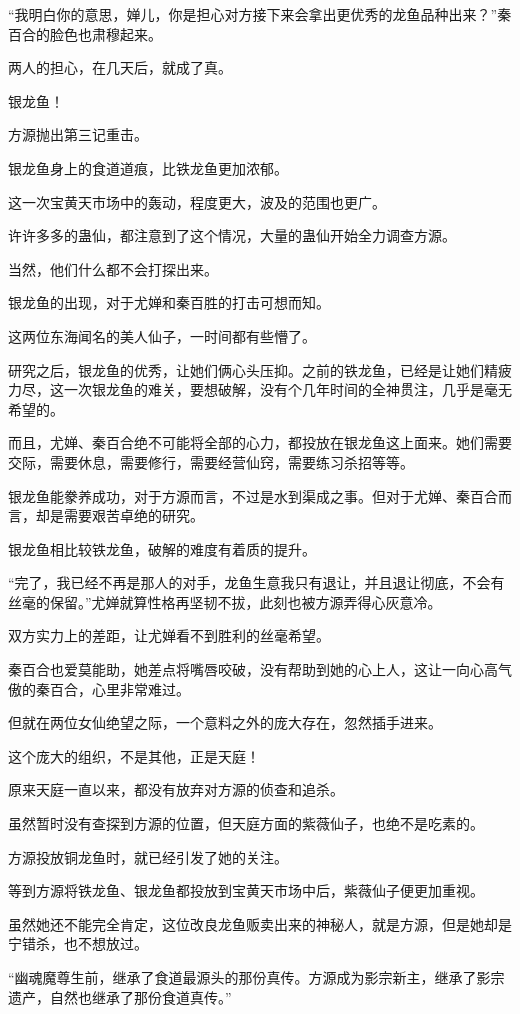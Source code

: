 \begin{this_body}
“我明白你的意思，婵儿，你是担心对方接下来会拿出更优秀的龙鱼品种出来？”秦百合的脸色也肃穆起来。

两人的担心，在几天后，就成了真。

银龙鱼！

方源抛出第三记重击。

银龙鱼身上的食道道痕，比铁龙鱼更加浓郁。

这一次宝黄天市场中的轰动，程度更大，波及的范围也更广。

许许多多的蛊仙，都注意到了这个情况，大量的蛊仙开始全力调查方源。

当然，他们什么都不会打探出来。

银龙鱼的出现，对于尤婵和秦百胜的打击可想而知。

这两位东海闻名的美人仙子，一时间都有些懵了。

研究之后，银龙鱼的优秀，让她们俩心头压抑。之前的铁龙鱼，已经是让她们精疲力尽，这一次银龙鱼的难关，要想破解，没有个几年时间的全神贯注，几乎是毫无希望的。

而且，尤婵、秦百合绝不可能将全部的心力，都投放在银龙鱼这上面来。她们需要交际，需要休息，需要修行，需要经营仙窍，需要练习杀招等等。

银龙鱼能豢养成功，对于方源而言，不过是水到渠成之事。但对于尤婵、秦百合而言，却是需要艰苦卓绝的研究。

银龙鱼相比较铁龙鱼，破解的难度有着质的提升。

“完了，我已经不再是那人的对手，龙鱼生意我只有退让，并且退让彻底，不会有丝毫的保留。”尤婵就算性格再坚韧不拔，此刻也被方源弄得心灰意冷。

双方实力上的差距，让尤婵看不到胜利的丝毫希望。

秦百合也爱莫能助，她差点将嘴唇咬破，没有帮助到她的心上人，这让一向心高气傲的秦百合，心里非常难过。

但就在两位女仙绝望之际，一个意料之外的庞大存在，忽然插手进来。

这个庞大的组织，不是其他，正是天庭！

原来天庭一直以来，都没有放弃对方源的侦查和追杀。

虽然暂时没有查探到方源的位置，但天庭方面的紫薇仙子，也绝不是吃素的。

方源投放铜龙鱼时，就已经引发了她的关注。

等到方源将铁龙鱼、银龙鱼都投放到宝黄天市场中后，紫薇仙子便更加重视。

虽然她还不能完全肯定，这位改良龙鱼贩卖出来的神秘人，就是方源，但是她却是宁错杀，也不想放过。

“幽魂魔尊生前，继承了食道最源头的那份真传。方源成为影宗新主，继承了影宗遗产，自然也继承了那份食道真传。”


\end{this_body}
